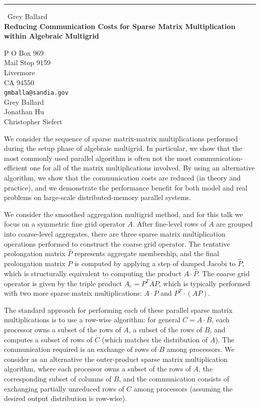 \documentclass{report}
\begin{document}
\begin{center}
\rule{6in}{1pt} \
{\large Grey Ballard \\
{\bf Reducing Communication Costs for Sparse Matrix Multiplication within Algebraic Multigrid}}

P O Box 969 \\ Mail Stop 9159 \\ Livermore \\ CA 94550
\\
{\tt gmballa@sandia.gov}\\
Grey Ballard\\
Jonathan Hu\\
Christopher Siefert\end{center}

We consider the sequence of sparse matrix-matrix multiplications
performed during the setup phase of algebraic multigrid.
In particular, we show that the most commonly used parallel algorithm is
often not the most communication-efficient one for all of the matrix
multiplications involved.
By using an alternative algorithm, we show that the communication costs
are reduced (in theory and practice), and we demonstrate the performance
benefit for both model and real problems on large-scale
distributed-memory parallel systems.

We consider the smoothed aggregation multigrid method, and for this talk
we focus on a symmetric fine grid operator $A$.
After fine-level rows of $A$ are grouped into coarse-level aggregates,
there are three sparse matrix multiplication operations performed to
construct the coarse grid operator.
The tentative prolongation matrix $\widehat{P}$ represents aggregate
membership, and the final prolongation matrix $P$ is computed by applying
a step of damped Jacobi to $\widehat{P}$, which is structurally
equivalent to computing the product $A\cdot \widehat{P}$.
The coarse grid operator is given by the triple product $A_c=P^TAP$,
which is typically performed with two more sparse matrix multiplications:
$A\cdot P$ and $P^T\cdot (AP)$.

The standard approach for performing each of these parallel sparse matrix
multiplications is to use a row-wise algorithm: for general $C=A\cdot B$,
each processor owns a subset of the rows of $A$, a subset of the rows of
$B$, and computes a subset of rows of $C$ (which matches the distribution
of $A$).
The communication required is an exchange of rows of $B$ among processors.
We consider as an alternative the outer-product sparse matrix
multiplication algorithm, where each processor owns a subset of the rows
of $A$, the corresponding subset of columns of $B$, and the communication
consists of exchanging partially unreduced rows of $C$ among processors
(assuming the desired output distribution is row-wise).
\end{document}
